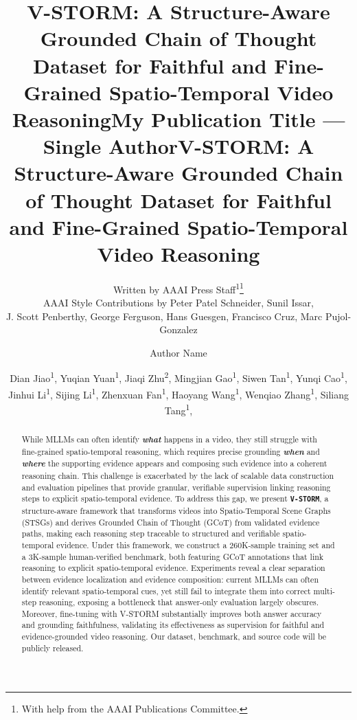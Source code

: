 \documentclass[letterpaper]{article} %
\title{V-STORM: A Structure-Aware Grounded Chain of Thought Dataset for Faithful and Fine-Grained Spatio-Temporal Video Reasoning}
\author{
    Written by AAAI Press Staff\textsuperscript{\rm 1}\thanks{With help from the AAAI Publications Committee.}\\
    AAAI Style Contributions by Peter Patel Schneider,
    Sunil Issar,\\
    J. Scott Penberthy,
    George Ferguson,
    Hans Guesgen,
    Francisco Cruz\equalcontrib\corresponding,
    Marc Pujol-Gonzalez\equalcontrib\corresponding
}
\title{My Publication Title --- Single Author}
\author {
    Author Name
}
\title{V-STORM: A Structure-Aware Grounded Chain of Thought Dataset for Faithful and Fine-Grained Spatio-Temporal Video Reasoning}
\author {
    Dian Jiao\textsuperscript{\rm 1}\equalcontrib,
    Yuqian Yuan\textsuperscript{\rm 1}\equalcontrib,
    Jiaqi Zhu\textsuperscript{\rm 2},
    Mingjian Gao\textsuperscript{\rm 1},
    Siwen Tan\textsuperscript{\rm 1},
    Yunqi Cao\textsuperscript{\rm 1},
    Jinhui Li\textsuperscript{\rm 1},
    Sijing Li\textsuperscript{\rm 1},
    Zhenxuan Fan\textsuperscript{\rm 1},
    Haoyang Wang\textsuperscript{\rm 1},
    Wenqiao Zhang\textsuperscript{\rm 1}\corresponding,
    Siliang Tang\textsuperscript{\rm 1}\corresponding,
}
\begin{document}
\nocopyright
\maketitle


\begin{abstract}
While MLLMs can often identify \textbf{\emph{what}} happens in a video, they still struggle with
fine-grained spatio-temporal reasoning, which requires precise grounding \textbf{\emph{when}} and \textbf{\emph{where}} the supporting evidence appears and composing such evidence into a coherent reasoning chain. This challenge is exacerbated by the lack of scalable data construction and evaluation pipelines that provide granular, verifiable supervision linking reasoning steps to explicit spatio-temporal evidence.
To address this gap, we present \textbf{\texttt{V-STORM}}, a structure-aware framework that transforms videos into Spatio-Temporal Scene Graphs (STSGs) and derives Grounded Chain of Thought (GCoT) from validated evidence paths, making each reasoning step traceable to structured and verifiable spatio-temporal evidence.
Under this framework, we construct a 260K-sample training set and a 3K-sample human-verified benchmark, both featuring GCoT annotations that link reasoning to explicit spatio-temporal evidence.
Experiments reveal a clear separation between evidence localization and evidence composition: current MLLMs can often identify relevant spatio-temporal cues, yet still fail to integrate them into correct multi-step reasoning, exposing a bottleneck that answer-only evaluation largely obscures. Moreover, fine-tuning with V-STORM substantially improves both answer accuracy and grounding faithfulness, validating its effectiveness as supervision for faithful and evidence-grounded video reasoning.
Our dataset, benchmark, and source code will be publicly released.
\end{abstract}

\end{document}
